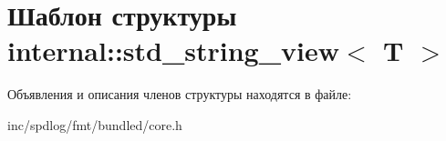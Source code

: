\hypertarget{structinternal_1_1std__string__view}{}\section{Шаблон структуры internal\+:\+:std\+\_\+string\+\_\+view$<$ T $>$}
\label{structinternal_1_1std__string__view}


Объявления и описания членов структуры находятся в файле\+:\begin{DoxyCompactItemize}
\item 
inc/spdlog/fmt/bundled/core.\+h\end{DoxyCompactItemize}

